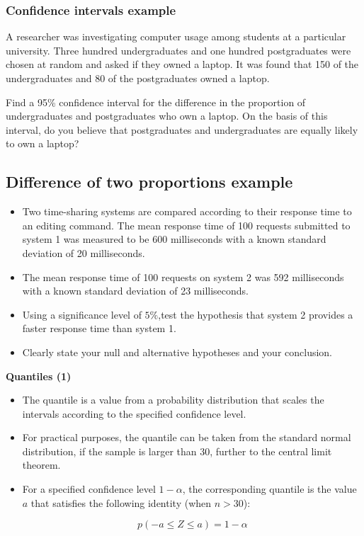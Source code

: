 \documentclass[]{report}
\begin{document}




\subsubsection{Confidence intervals example}
A researcher was investigating computer usage among students at a particular university. Three hundred undergraduates and one hundred postgraduates were chosen at random and asked if they owned a laptop. It was found that 150 of
the undergraduates and 80 of the postgraduates owned a laptop.

Find a 95\% confidence interval for the difference in the proportion of undergraduates and postgraduates who own a laptop. On the basis of this interval, do you believe that postgraduates and undergraduates are
equally likely to own a laptop?

\subsection{Difference of two proportions example}
\begin{itemize}
\item Two time-sharing systems are compared according to their response time to an editing command. The mean response time of 100 requests submitted to system 1 was measured to be 600 milliseconds with a
known standard deviation of 20 milliseconds. 
\item The mean response time
of 100 requests on system 2 was 592 milliseconds with a known standard deviation of 23 milliseconds. 
\item Using a significance level of $5\%$,test the hypothesis that system 2 provides a faster response time than
system 1. 
\item Clearly state your null and alternative hypotheses and your conclusion.
\end{itemize}





\noindent \textbf{Quantiles (1) }

\begin{itemize}
\item The quantile is a value from a probability distribution that scales the intervals according to the specified confidence level.
\item For practical purposes, the quantile can be taken from the standard normal distribution, if the sample is larger than 30, further to the central limit theorem.
\item For a specified confidence level $1-\alpha $, the corresponding quantile is the value $a$ that satisfies the following identity (when $n > 30$):

\[ p( -a \leq Z \leq a) = 1- \alpha \]

\end{itemize}
\end{document}

